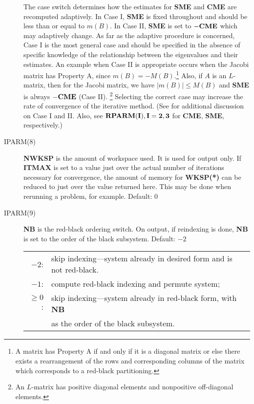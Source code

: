 \begin{description}
                 \noindent
                 The case switch determines how the estimates for 
                 {\bf SME} and {\bf CME} are recomputed adaptively.  In 
                 Case I, {\bf SME} is fixed throughout and should be less 
                 than or equal to $m(B)$.  In Case II, {\bf SME} is set 
                 to ${\bf -CME}$ which may adaptively change.  As far as 
                 the adaptive procedure is concerned, Case I is the most
                 general case and should be specified in the absence of
                 specific knowledge of the relationship between the 
                 eigenvalues and their estimates.  An example when Case II
                 is appropriate occurs when the Jacobi matrix has 
                 Property A, since $m(B) = -M(B)$.\footnote{A matrix has
                 Property A if and only if it is a diagonal matrix or
                 else there exists a rearrangement of the rows and 
                 corresponding columns of the matrix which corresponds to 
                 a red-black partitioning.}  Also, if $A$ is an $L$-matrix, 
                 then for the Jacobi matrix, we have $|m(B)| \leq M(B)$ 
                 and {\bf SME} is always ${\bf -CME}$ (Case II).
                 \footnote{An $L$-matrix has positive diagonal elements
                 and nonpositive off-diagonal elements.} Selecting the
                 correct case may increase the rate of convergence of 
                 the iterative method.  (See \cite{2} for additional
                 discussion on Case I and II.  Also, see 
                 ${\bf RPARM(I), I=2,3}$ for {\bf CME}, {\bf SME}, 
                 respectively.)
 
 \item[IPARM(8)] {\bf NWKSP} is the amount of workspace used.  It is used 
                 for output only.  If {\bf ITMAX} is set to a value just 
                 over the actual number of iterations necessary for 
                 convergence, the amount of memory for {\bf WKSP(*)} can 
                 be reduced to just over the value returned here.  This 
                 may be done when rerunning a problem, for example.  
                 Default: $0$

 \item[IPARM(9)] {\bf NB} is the red-black ordering switch.  On output, 
                 if reindexing is done, {\bf NB} is set to the order of 
                 the black subsystem.  Default: $-2$
 
                 \begin{tabular}{rl} 
                  $-2$:     & skip indexing---system already in
                               desired form and is not red-black. \\
                  $-1$:     & compute red-black indexing and permute 
                              system; \\
                  $\geq 0$: & skip indexing---system already in red-black
                              form, with {\bf NB} \\
                            & as the order of the black subsystem.
                 \end{tabular}


\end{description}
